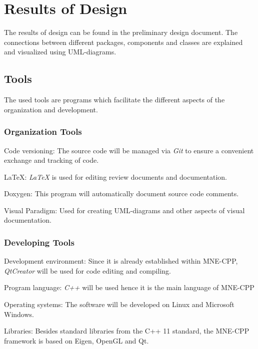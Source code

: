 \section{Results of Design}

The results of design can be found in the preliminary design document.
The connections between different packages, components and classes are explained and visualized using UML-diagrams. 

\subsection{Tools} 

The used tools are programs which facilitate the different aspects of the organization and development.

\subsubsection{Organization Tools}
	\begin{aims}
		
		\item[Code versioning:] The source code will be managed via \textit{Git} to ensure a convenient exchange and tracking of code.
		
		\item[LaTeX:] \textit{LaTeX} is used for editing review documents and documentation.
		
		\item[Doxygen:] This program will automatically document source code comments.
		
		\item[Visual Paradigm:] Used for creating UML-diagrams and other aspects of visual documentation. 
	\end{aims}

\subsubsection{Developing Tools}
	\begin{aims}
		
		\item[Development environment:] Since it is already established within MNE-CPP, \textit{QtCreator} will be used for code editing and compiling.
		
		\item[Program language:] \textit{C++} will be used hence it is the main language of MNE-CPP 
		\item[Operating systems:] The software will be developed on Linux and Microsoft Windows.
		
		\item[Libraries:] Besides standard libraries from the C++ 11 standard, the MNE-CPP framework is based on Eigen, OpenGL and Qt.
		
	\end{aims}

